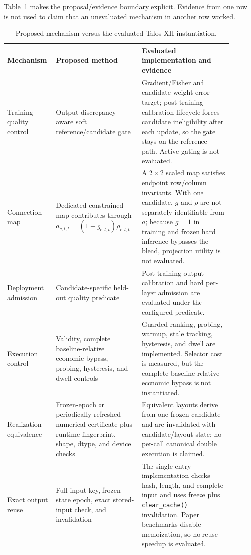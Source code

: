 \documentclass{article}
\begin{document}
Table~\ref{tab:proposal-implementation-boundary} makes the proposal/evidence
boundary explicit. Evidence from one row is not used to claim that an
unevaluated mechanism in another row worked.

\begin{table}[t]
\centering
\caption{Proposed mechanism versus the evaluated Talos-XII instantiation.}
\label{tab:proposal-implementation-boundary}
\small
\begin{tabular}{p{0.18\linewidth}p{0.34\linewidth}p{0.38\linewidth}}
\toprule
Mechanism & Proposed method & Evaluated implementation and evidence \\
\midrule
Training quality control &
Output-discrepancy-aware soft reference/candidate gate &
Gradient/Fisher and candidate-weight-error target; post-training calibration
lifecycle forces candidate ineligibility after each update, so the gate stays
on the reference path. Active gating is not evaluated. \\
Connection map &
Dedicated constrained map contributes through
$a_{c,l,t}=(1-g_{c,l,t})\rho_{c,l,t}$ &
A $2\times2$ scaled map satisfies endpoint row/column invariants. With one
candidate, $g$ and $\rho$ are not separately identifiable from $a$; because
$g=1$ in training and frozen hard inference bypasses the blend, projection
utility is not evaluated. \\
Deployment admission &
Candidate-specific held-out quality predicate &
Post-training output calibration and hard per-layer admission are evaluated
under the configured predicate. \\
Execution control &
Validity, complete baseline-relative economic bypass, probing, hysteresis, and
dwell controls &
Guarded ranking, probing, warmup, stale tracking, hysteresis, and dwell are
implemented. Selector cost is measured, but the complete baseline-relative
economic bypass is not instantiated. \\
Realization equivalence &
Frozen-epoch or periodically refreshed numerical certificate plus runtime
fingerprint, shape, dtype, and device checks &
Equivalent layouts derive from one frozen candidate and are invalidated with
candidate/layout state; no per-call canonical double execution is claimed. \\
Exact output reuse &
Full-input key, frozen-state epoch, exact stored-input check, and invalidation &
The single-entry implementation checks hash, length, and complete input and
uses freeze plus \texttt{clear\_cache()} invalidation. Paper benchmarks disable
memoization, so no reuse speedup is evaluated. \\
\bottomrule
\end{tabular}
\end{table}
\end{document}
